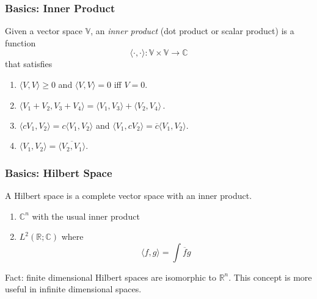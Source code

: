 \documentclass[12pt]{beamer}
\begin{document}
\begin{frame}
    \frametitle{ Basics: Inner Product}
    \begin{definition}
        Given a vector space $\mathbb{V}$, an \emph{inner product } (dot product or scalar product)
        is a function
        \begin{equation*}
            \langle \cdot, \cdot \rangle : \mathbb{V}\times \mathbb{V} \to \mathbb{C}
        \end{equation*}
        that satisfies
        \begin{enumerate}
            \item $\langle V, V\rangle \geq 0$ and $\langle V, V \rangle = 0$ iff $V = 0$.
            \item $\langle V_1 + V_2, V_3 + V_4 \rangle = \langle V_1 , V_3 \rangle +
                                                \langle V_2 , V_4 \rangle \,.$
            \item $\langle c V_1, V_2\rangle = c \langle V_1, V_2 \rangle $
                and
                $ \langle V_1, c V_2 \rangle = \overline{c} \langle V_1, V_2 \rangle$.
            \item $\langle V_1, V_2 \rangle = \overline{ \langle V_2, V_1 \rangle  }$.
        \end{enumerate}
    \end{definition}
\end{frame}


\begin{frame}
    \frametitle{ Basics: Hilbert Space}
    \begin{definition}
        A Hilbert space is a complete vector space with an inner product.
    \end{definition}
    \begin{example}
        \begin{enumerate}
            \item $\mathbb{C}^n$ with the usual inner product
            \item $L^2(\mathbb{R};\mathbb{C})$ where
                \begin{equation*}
                    \langle f, g \rangle = \int \overline{f} g 
                \end{equation*}
        \end{enumerate}
        Fact: finite dimensional Hilbert spaces are isomorphic to $\mathbb{R}^n$.
        This concept is more useful in infinite dimensional spaces.
    \end{example}

\end{frame}
\end{document}
